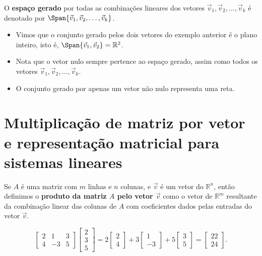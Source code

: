 O \textbf{espaço gerado} por todas as combinações lineares dos vetores $\vec{v}_1, \vec{v}_2, \dots, \vec{v}_k$ é denotado por $\Span \{ \vec{v}_1, \vec{v}_2, \dots, \vec{v}_k \}$.

\begin{itemize}
	\item Vimos que o conjunto gerado pelos dois vetores do exemplo anterior é o plano inteiro, isto é, $\Span \{ \vec{v}_1, \vec{v}_2 \} = \mathbb{R}^2$.
	\item Nota que o vetor nulo sempre pertence ao espaço gerado, assim como todos os vetores $\vec{v}_1, \vec{v}_2, \dots, \vec{v}_k$.
	\item O conjunto gerado por apenas um vetor não nulo representa uma reta.
\end{itemize}



\section{Multiplicação de matriz por vetor e representação matricial para sistemas lineares}

Se $A$ é uma matriz com $m$ linhas e $n$ colunas, e $\vec{v}$ é um vetor do $\mathbb{R}^n$, então definimos o {\bf produto da matriz $A$ pelo vetor $\vec{v}$ } como o vetor de $\mathbb{R}^m$ resultante da combinação linear das colunas de $A$ com coeficientes dados pelas entradas do vetor $\vec{v}$.

\begin{ex}
	\begin{equation}
	\left[
	\begin{array}{ccc}
	2 &  1 & 3  \\
	4 & -3 & 5
	\end{array}
	\right]
	\left[
	\begin{array}{c}
	2   \\
	3  \\
	5
	\end{array}
	\right] = 2
	\left[
	\begin{array}{c}
    2   \\
	4
	\end{array}
	\right]
	+3 \left[
	\begin{array}{c}
	1   \\
	-3
	\end{array}
	\right]+
	5
	\left[
	\begin{array}{c}
	3   \\
	5
	\end{array}
	\right]=
	\left[
	\begin{array}{c}
	22   \\
	24
	\end{array}
	\right].
	\end{equation}
\end{ex}



